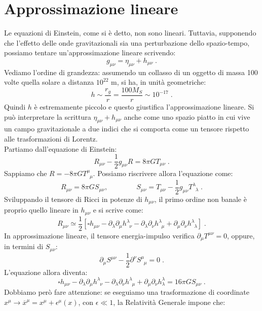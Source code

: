 \documentclass[12pt,a4paper]{report}
\theoremstyle{definition}
\begin{document}
\section{Approssimazione lineare}
Le equazioni di Einstein, come si è detto, non sono lineari. Tuttavia, supponendo che l'effetto delle onde gravitazionali sia una perturbazione dello spazio-tempo, possiamo tentare un'approssimazione lineare scrivendo:
$$
g_{\mu\nu}=\eta_{\mu\nu}+h_{\mu\nu}\;.
$$
Vediamo l'ordine di grandezza: assumendo un collasso di un oggetto di massa 100 volte quella solare a distanza $10^{22}$ m, si ha, in unità geometriche:
$$
h\sim \frac{r_g}{r}=\frac{100 M_S}{r}\sim 10^{-17}\;.
$$
Quindi $h$ è estremamente piccolo e questo giustifica l'approssimazione lineare. Si può interpretare la scrittura $\eta_{\mu\nu}+h_{\mu\nu}$ anche come uno spazio piatto in cui vive un campo gravitazionale a due indici che si comporta come un tensore rispetto alle trasformazioni di Lorentz. \\
Partiamo dall'equazione di Einstein:
$$
R_{\mu\nu}-\frac{1}{2}g_{\mu\nu}R=8\pi GT_{\mu\nu}\;.
$$
Sappiamo che $R=-8\pi GT^{\mu}_{\;\;\mu}$. Possiamo riscrivere allora l'equazione come:
\begin{equation}
R_{\mu\nu}=8\pi GS_{\mu\nu},\qquad\qquad S_{\mu\nu}=T_{\mu\nu}-\frac{1}{2}g_{\mu\nu}T^{\lambda}_{\;\;\lambda}\;.
\end{equation}
Sviluppando il tensore di Ricci in potenze di $h_{\mu\nu}$, il primo ordine non banale è proprio quello lineare in $h_{\mu\nu}$ e si scrive come:
\begin{equation}
R_{\mu\nu}\simeq \frac{1}{2}\left[\square h_{\mu\nu}-\partial_{\lambda}\partial_{\mu}h^{\lambda}_{\;\;\nu}-\partial_{\lambda}\partial_{\nu}h^{\lambda}_{\;\;\mu}+\partial_{\mu}\partial_{\nu}h^{\lambda}_{\;\;\lambda}\right]\;.
\end{equation}
In approssimazione lineare, il tensore energia-impulso verifica $\partial_{\mu}T^{\mu\nu}=0$, oppure, in termini di $S_{\mu\nu}$:
\begin{equation}
\partial_{\mu}S^{\mu\nu}-\frac{1}{2}\partial^{\nu}S^{\mu}_{\;\;\mu}=0\;.
\end{equation}
L'equazione allora diventa:
\begin{equation}
\square h_{\mu\nu}-\partial_{\lambda}\partial_{\mu}h^{\lambda}_{\;\;\nu}-\partial_{\lambda}\partial_{\nu}h^{\lambda}_{\;\;\mu}+\partial_{\mu}\partial_{\nu}h^{\lambda}_{\lambda}=16\pi GS_{\mu\nu}\;.
\end{equation}
Dobbiamo però fare attenzione: se eseguiamo una trasformazione di coordinate $x^{\mu}\longrightarrow \overline{x}^{\mu}=x^{\mu}+\epsilon^{\mu}(x)$, con $\epsilon\ll 1$, la Relatività Generale impone che:
\end{document}
